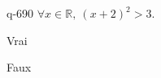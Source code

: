 \begin{truefalse}{q-690}
$\forall x \in \mathbb R,\: (x+2)^2>3$.
\item Vrai
\item* Faux
\end{truefalse}

